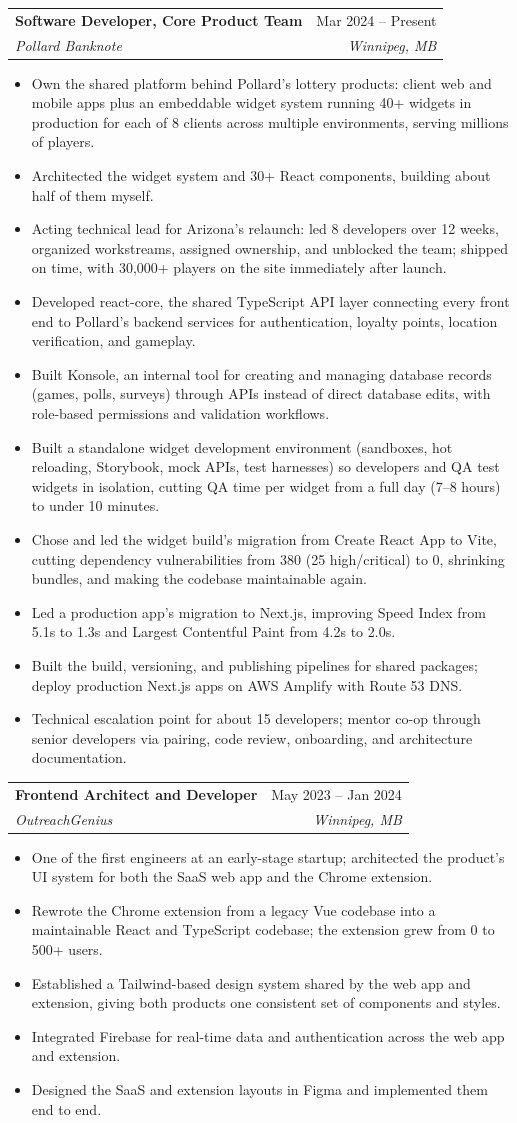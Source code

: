 \documentclass[letterpaper,11pt]{article}
\makeatletter
\newcommand{\resumeItem}[1]{
  \item\small{
    {#1 \vspace{-2pt}}
  }
}
\newcommand{\resumeSubheading}[4]{
  \vspace{-2pt}\item
    \begin{tabular*}{0.97\textwidth}[t]{l@{\extracolsep{\fill}}r}
      \textbf{#1} & #2 \\
      \textit{\small#3} & \textit{\small #4} \\
    \end{tabular*}\vspace{-7pt}
}
\newcommand{\resumeItemListStart}{\begin{itemize}}
\newcommand{\resumeItemListEnd}{\end{itemize}\vspace{-5pt}}
\makeatother
\begin{document}
   \resumeSubheading
      {Software Developer, Core Product Team}{Mar 2024 -- Present}
      {Pollard Banknote}{Winnipeg, MB}
        \resumeItemListStart
        \resumeItem{Own the shared platform behind Pollard's lottery products: client web and mobile apps plus an embeddable widget system running 40+ widgets in production for each of 8 clients across multiple environments, serving millions of players. }
        \resumeItem{Architected the widget system and 30+ React components, building about half of them myself.}
        \resumeItem{Acting technical lead for Arizona's relaunch: led 8 developers over 12 weeks, organized workstreams, assigned ownership, and unblocked the team; shipped on time, with 30,000+ players on the site immediately after launch.}
        \resumeItem{Developed react-core, the shared TypeScript API layer connecting every front end to Pollard's backend services for authentication, loyalty points, location verification, and gameplay.}
        \resumeItem{Built Konsole, an internal tool for creating and managing database records (games, polls, surveys) through APIs instead of direct database edits, with role-based permissions and validation workflows.}
        \resumeItem{Built a standalone widget development environment (sandboxes, hot reloading, Storybook, mock APIs, test harnesses) so developers and QA test widgets in isolation, cutting QA time per widget from a full day (7--8 hours) to under 10 minutes.}
        \resumeItem{Chose and led the widget build's migration from Create React App to Vite, cutting dependency vulnerabilities from 380 (25 high/critical) to 0, shrinking bundles, and making the codebase maintainable again.}
        \resumeItem{Led a production app's migration to Next.js, improving Speed Index from 5.1s to 1.3s and Largest Contentful Paint from 4.2s to 2.0s.}
        \resumeItem{Built the build, versioning, and publishing pipelines for shared packages; deploy production Next.js apps on AWS Amplify with Route 53 DNS.}
        \resumeItem{Technical escalation point for about 15 developers; mentor co-op through senior developers via pairing, code review, onboarding, and architecture documentation.}
      \resumeItemListEnd

    \resumeSubheading
      {Frontend Architect and Developer}{May 2023 -- Jan 2024}
      {OutreachGenius}{Winnipeg, MB}
      \resumeItemListStart
        \resumeItem{One of the first engineers at an early-stage startup; architected the product's UI system for both the SaaS web app and the Chrome extension.}
        \resumeItem{Rewrote the Chrome extension from a legacy Vue codebase into a maintainable React and TypeScript codebase; the extension grew from 0 to 500+ users.}
        \resumeItem{Established a Tailwind-based design system shared by the web app and extension, giving both products one consistent set of components and styles.}
        \resumeItem{Integrated Firebase for real-time data and authentication across the web app and extension.}
        \resumeItem{Designed the SaaS and extension layouts in Figma and implemented them end to end.}
      \resumeItemListEnd
\end{document}
